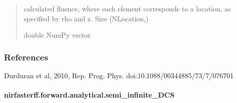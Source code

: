 \documentclass[letterpaper,10pt,english]{sphinxmanual}
\begin{document}
\begin{fulllineitems}
\begin{quote}
\begin{description}
\sphinxAtStartPar
calculated fluence, where each element corresponds to a location, as specified by rho and z. Size (NLocation,)

\sphinxAtStartPar
double NumPy vector

\end{description}\end{quote}
\subsubsection*{References}

\sphinxAtStartPar
Durduran et al, 2010, Rep. Prog. Phys. doi:10.1088/0034\sphinxhyphen{}4885/73/7/076701

\end{fulllineitems}


\sphinxstepscope


\paragraph{nirfasterff.forward.analytical.semi\_infinite\_DCS}
\label{\detokenize{_autosummary/nirfasterff.forward.analytical.semi_infinite_DCS:nirfasterff-forward-analytical-semi-infinite-dcs}}\label{\detokenize{_autosummary/nirfasterff.forward.analytical.semi_infinite_DCS::doc}}
\end{document}
